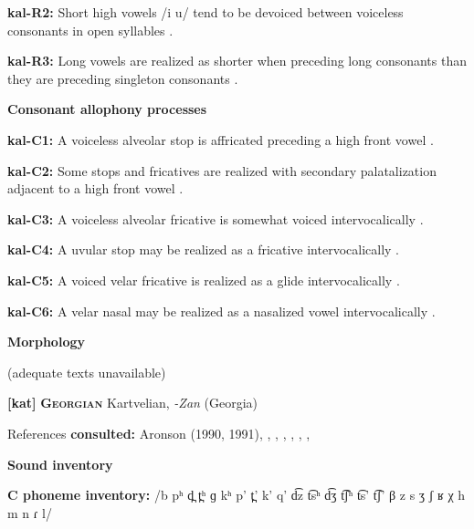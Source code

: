 \textbf{kal-R2:} Short high vowels /i u/ tend to be devoiced between voiceless consonants in open syllables \citep[335]{Fortescue1984}.



\textbf{kal-R3:} Long vowels are realized as shorter when preceding long consonants than they are preceding singleton consonants \citep[65]{Jacobsen2000}.



\textbf{Consonant allophony processes}



\textbf{kal-C1:} A voiceless alveolar stop is affricated preceding a high front vowel \citep[333]{Fortescue1984}.



\textbf{kal-C2:} Some stops and fricatives are realized with secondary palatalization adjacent to a high front vowel \citep[333]{Fortescue1984}.



\textbf{kal-C3:} A voiceless alveolar fricative is somewhat voiced intervocalically \citep[334]{Fortescue1984}.



\textbf{kal-C4:} A uvular stop may be realized as a fricative intervocalically \citep[333]{Fortescue1984}.



\textbf{kal-C5:} A voiced velar fricative is realized as a glide intervocalically \citep[334]{Fortescue1984}.



\textbf{kal-C6:} A velar nasal may be realized as a nasalized vowel intervocalically \citep[334]{Fortescue1984}.



\textbf{Morphology}



(adequate texts unavailable)



\textbf{[kat]}   \textbf{\textsc{Georgian}}    Kartvelian, \textit{-Zan} (Georgia)



References \textbf{consulted:} Aronson (1990, 1991), \citet{Chitoran1998}, \citet{Hewitt1995}, \citet{JunEtAl2006}, \citet{ShostedChikovani2006}, \citet{SkopeteasFéry2010}, \citet{Vicenek2010}, \citet{Vogt1958}



\textbf{Sound inventory}



\textbf{C phoneme inventory:} /b pʰ d̪ t̪ʰ ɡ kʰ p’ t̪’ k’ q’ d͡z t͡sʰ d͡ʒ t͡ʃʰ t͡s’ t͡ʃ’ β z s ʒ ʃ ʁ χ h m n ɾ l/



